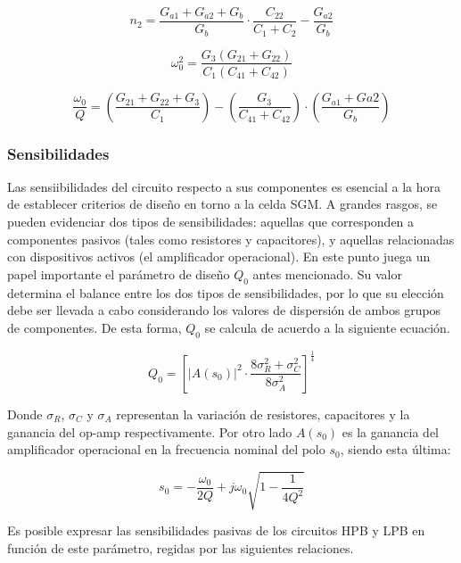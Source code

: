\begin{equation}
\label{lpbn2}
n_ 2 = \frac{G_{a1} + G_{a2} + G_b}{G_b} \cdot \frac{C_{22}}{C_{1}+C_{2}} - \frac{G_{a2}}{G_b}
\end{equation}

\begin{equation}
\label{lpbw0}
\omega_0^2 = \frac{G_3 \left( G_{21} + G_{22} \right)}{C_1 \left( C_{41} + C_{42} \right)}
\end{equation}

\begin{equation}
\label{lpbwoQ}
\frac{\omega_0}{Q} = \left( \frac{G_{21}+G_{22}+G_3}{C_1} \right) - \left( \frac{G_3}{C_{41}+C_{42}} \right) \cdot \left( \frac{G_{a1} + G{a2}}{G_b} \right)
\end{equation}


\subsubsection{Sensibilidades}
Las sensiibilidades del circuito respecto a sus componentes es esencial a la hora de establecer criterios de dise\~no en torno a la celda SGM. A grandes rasgos, se pueden evidenciar dos tipos de sensibilidades: aquellas que corresponden a componentes pasivos (tales como resistores y capacitores), y aquellas relacionadas con dispositivos activos (el amplificador operacional). En este punto juega un papel importante el par\'ametro de dise\~no $Q_0$ antes mencionado. Su valor determina el balance entre los dos tipos de sensibilidades, por lo que su elecci\'on debe ser llevada a cabo considerando los valores de dispersi\'on de ambos grupos de componentes. De esta forma, $Q_0$ se calcula de acuerdo a la siguiente ecuaci\'on.

\begin{equation}
\label{q0}
Q_0 = \left[ |A(s_0)|^2 \cdot \frac{8\sigma_R^2 + \sigma_C^2}{8\sigma_A^2}\right]^{\frac{1}{4}}
\end{equation}  

Donde $\sigma_R$, $\sigma_C$ y $\sigma_A$ representan la variaci\'on de resistores, capacitores y la ganancia del op-amp  respectivamente. Por otro lado $A(s_0)$ es la ganancia del amplificador operacional en la frecuencia nominal del polo $s_0$, siendo esta \'ultima:

\begin{equation}
s_0 = -\frac{\omega_0}{2Q} + j\omega_0\sqrt{1-\frac{1}{4Q^2}}
\end{equation}

Es posible expresar las sensibilidades pasivas de los circuitos HPB y LPB en funci\'on de este par\'ametro, regidas por las siguientes relaciones.


